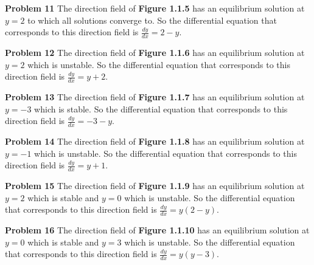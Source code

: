 \documentclass{article}
\begin{document}
\textbf{Problem 11} The direction field of \textbf{Figure 1.1.5} has an equilibrium solution at $y = 2$ to which all solutions converge to. 
So the differential equation that corresponds to this direction field is $\frac{dy}{dx} = 2 - y$.

\noindent\textbf{Problem 12} The direction field of \textbf{Figure 1.1.6} has an equilibrium solution at $y = 2$ which is unstable. 
So the differential equation that corresponds to this direction field is $\frac{dy}{dx} = y + 2$.

\noindent\textbf{Problem 13} The direction field of \textbf{Figure 1.1.7} has an equilibrium solution at $y = - 3$ which is stable. 
So the differential equation that corresponds to this direction field is $\frac{dy}{dx} = -3 - y$.

\noindent\textbf{Problem 14} The direction field of \textbf{Figure 1.1.8} has an equilibrium solution at $y = -1$ which is unstable. 
So the differential equation that corresponds to this direction field is $\frac{dy}{dx} = y + 1$.

\noindent\textbf{Problem 15} The direction field of \textbf{Figure 1.1.9} has an equilibrium solution at $y = 2$ which is stable and $y=0$ which is unstable. 
So the differential equation that corresponds to this direction field is $\frac{dy}{dx} = y(2 - y)$.

\noindent\textbf{Problem 16} The direction field of \textbf{Figure 1.1.10} has an equilibrium solution at $y = 0$ which is stable and $y = 3$ which is unstable. 
So the differential equation that corresponds to this direction field is $\frac{dy}{dx} = y(y - 3)$.
\end{document}

